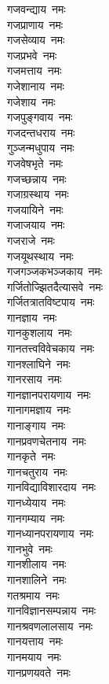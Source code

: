 \begin{multicols}{2}
\begin{flushleft}
गजवन्द्याय~नमः\hfill{}\\
गजप्राणाय~नमः\\
गजसेव्याय~नमः\\
गजप्रभवे~नमः\\
गजमत्ताय~नमः\\
गजेशानाय~नमः\\
गजेशाय~नमः\\
गजपुङ्गवाय~नमः\\
गजदन्तधराय~नमः\\
गुञ्जन्मधुपाय~नमः\\
गजवेषभृते~नमः\hfill{}\\
गजच्छन्नाय~नमः\\
गजाग्रस्थाय~नमः\\
गजयायिने~नमः\\
गजाजयाय~नमः\\
गजराजे~नमः\\
गजयूथस्थाय~नमः\\
गजगञ्जकभञ्जकाय~नमः\\
गर्जितोज्झितदैत्यासवे~नमः\\
गर्जितत्रातविष्टपाय~नमः\\
गानज्ञाय~नमः\hfill{}\\
गानकुशलाय~नमः\\
गानतत्त्वविवेचकाय~नमः\\
गानश्लाघिने~नमः\\
गानरसाय~नमः\\
गानज्ञानपरायणाय~नमः\\
गानागमज्ञाय~नमः\\
गानाङ्गाय~नमः\\
गानप्रवणचेतनाय~नमः\\
गानकृते~नमः\\
गानचतुराय~नमः\hfill{}\\
गानविद्याविशारदाय~नमः\\
गानध्येयाय~नमः\\
गानगम्याय~नमः\\
गानध्यानपरायणाय~नमः\\
गानभुवे~नमः\\
गानशीलाय~नमः\\
गानशालिने~नमः\\
गतश्रमाय~नमः\\
गानविज्ञानसम्पन्नाय~नमः\\
गानश्रवणलालसाय~नमः\hfill{}\\
गानयत्ताय~नमः\\
गानमयाय~नमः\\
गानप्रणयवते~नमः\\

\end{flushleft}
\end{multicols}

